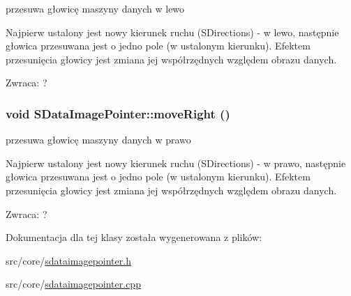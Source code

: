 przesuwa głowicę maszyny danych w lewo 

Najpierw ustalony jest nowy kierunek ruchu (SDirections) - w lewo, następnie głowica przesuwana jest o jedno pole (w ustalonym kierunku). Efektem przesunięcia głowicy jest zmiana jej współrzędnych względem obrazu danych. \begin{Desc}
\item[Zwraca:]? \end{Desc}
\hypertarget{classSDataImagePointer_b9d61712c0b2bf8b7beab735c0e59f75}{
\subsubsection[{moveRight}]{\setlength{\rightskip}{0pt plus 5cm}void SDataImagePointer::moveRight ()}}
\label{classSDataImagePointer_b9d61712c0b2bf8b7beab735c0e59f75}


przesuwa głowicę maszyny danych w prawo 

Najpierw ustalony jest nowy kierunek ruchu (SDirections) - w prawo, następnie głowica przesuwana jest o jedno pole (w ustalonym kierunku). Efektem przesunięcia głowicy jest zmiana jej współrzędnych względem obrazu danych. \begin{Desc}
\item[Zwraca:]? \end{Desc}


Dokumentacja dla tej klasy została wygenerowana z plików:\begin{CompactItemize}
\item 
src/core/\hyperlink{sdataimagepointer_8h}{sdataimagepointer.h}\item 
src/core/\hyperlink{sdataimagepointer_8cpp}{sdataimagepointer.cpp}\end{CompactItemize}
